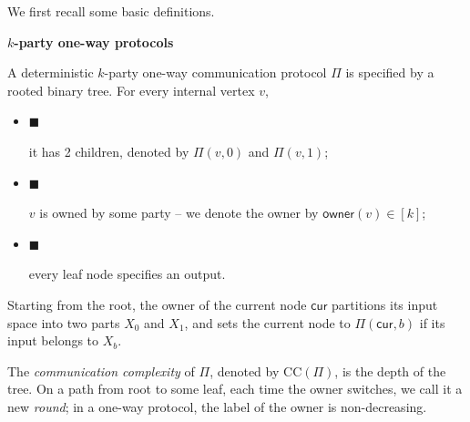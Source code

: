 We first recall some basic definitions.\par




\par\medskip\noindent\textbf{
$k$-party one-way protocols}\par




A deterministic $k$-party one-way communication protocol $\Pi$ is specified by a rooted binary tree.
For every internal vertex $v$,\par


\begin{itemize}


\item[] 
$\blacksquare$ 


it has 2 children, denoted by $\Pi(v,0)$ and $\Pi(v,1)$;\par





\item[] 
$\blacksquare$ 


$v$ is owned by some party – we denote the owner by $\mathsf{owner}(v)\in[k]$;\par





\item[] 
$\blacksquare$ 


every leaf node specifies an output.\par





\end{itemize}


Starting from the root,
the owner of the current node $\mathsf{cur}$ partitions its input space into two parts $X_{0}$ and $X_{1}$, and sets the current node to $\Pi(\mathsf{cur},b)$ if its input belongs to $X_{b}$.\par




The \emph{communication complexity} of $\Pi$, denoted by $\mathrm{CC}(\Pi)$, is the depth of the tree.
On a path from root to some leaf, each time the owner switches, we call it a new \emph{round}; in a one-way protocol, the label of the owner is non-decreasing.\par





